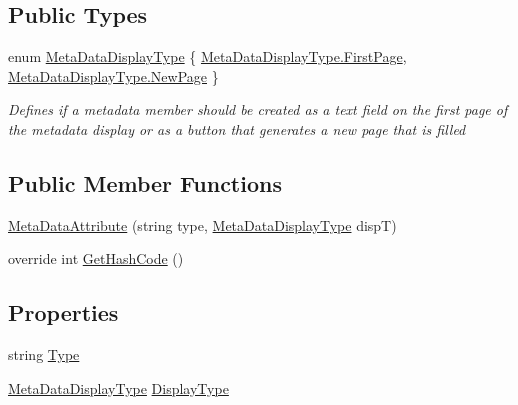 \subsection*{Public Types}
\begin{DoxyCompactItemize}
\item 
enum \mbox{\hyperlink{class_meta_data_attribute_a6ee5864d9fdea1bf498aa2d4b529af41}{Meta\+Data\+Display\+Type}} \{ \mbox{\hyperlink{class_meta_data_attribute_a6ee5864d9fdea1bf498aa2d4b529af41a93cb463a4e09c5dc2e7079741d8883d4}{Meta\+Data\+Display\+Type.\+First\+Page}}, 
\mbox{\hyperlink{class_meta_data_attribute_a6ee5864d9fdea1bf498aa2d4b529af41a30c38ed106d7d71b9a1ce0534ea1befd}{Meta\+Data\+Display\+Type.\+New\+Page}}
 \}
\begin{DoxyCompactList}\small\item\em Defines if a metadata member should be created as a text field on the first page of the metadata display or as a button that generates a new page that is filled \end{DoxyCompactList}\end{DoxyCompactItemize}
\subsection*{Public Member Functions}
\begin{DoxyCompactItemize}
\item 
\mbox{\hyperlink{class_meta_data_attribute_a68d376f9c6ad4daf9a4fe395fef6e13b}{Meta\+Data\+Attribute}} (string type, \mbox{\hyperlink{class_meta_data_attribute_a6ee5864d9fdea1bf498aa2d4b529af41}{Meta\+Data\+Display\+Type}} dispT)
\item 
override int \mbox{\hyperlink{class_meta_data_attribute_a8be44bd8123e36e30662fc1d1c0b99c8}{Get\+Hash\+Code}} ()
\end{DoxyCompactItemize}
\subsection*{Properties}
\begin{DoxyCompactItemize}
\item 
string \mbox{\hyperlink{class_meta_data_attribute_a99c1ec7f87489d95f2221e7f71976066}{Type}}
\item 
\mbox{\hyperlink{class_meta_data_attribute_a6ee5864d9fdea1bf498aa2d4b529af41}{Meta\+Data\+Display\+Type}} \mbox{\hyperlink{class_meta_data_attribute_ad1a7f54c9fc93b7b7ceeedee16419a6c}{Display\+Type}}
\end{DoxyCompactItemize}


